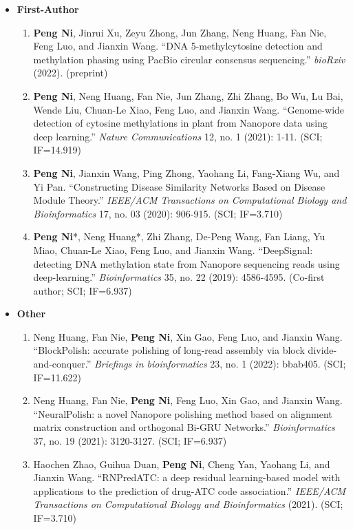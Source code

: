 \documentclass{resume}
\begin{document}
\begin{itemize}
  \item \textbf{First-Author}
  \begin{enumerate}
    \item \textbf{Peng Ni}, Jinrui Xu, Zeyu Zhong, Jun Zhang, Neng Huang, Fan Nie, Feng Luo, and Jianxin Wang. \enquote{DNA 5-methylcytosine detection and methylation phasing using PacBio circular consensus sequencing.} {\it bioRxiv} (2022). (preprint)
    \item \textbf{Peng Ni}, Neng Huang, Fan Nie, Jun Zhang, Zhi Zhang, Bo Wu, Lu Bai, Wende Liu, Chuan-Le Xiao, Feng Luo, and Jianxin Wang. \enquote{Genome-wide detection of cytosine methylations in plant from Nanopore data using deep learning.} {\it Nature Communications} 12, no. 1 (2021): 1-11. (SCI; IF=14.919)
    \item \textbf{Peng Ni}, Jianxin Wang, Ping Zhong, Yaohang Li, Fang-Xiang Wu, and Yi Pan. \enquote{Constructing Disease Similarity Networks Based on Disease Module Theory.} {\it IEEE/ACM Transactions on Computational Biology and Bioinformatics} 17, no. 03 (2020): 906-915. (SCI; IF=3.710)
    \item \textbf{Peng Ni}*, Neng Huang*, Zhi Zhang, De-Peng Wang, Fan Liang, Yu Miao, Chuan-Le Xiao, Feng Luo, and Jianxin Wang. \enquote{DeepSignal: detecting DNA methylation state from Nanopore sequencing reads using deep-learning.} {\it Bioinformatics} 35, no. 22 (2019): 4586-4595. (Co-first author; SCI; IF=6.937)
  \end{enumerate}
  \item \textbf{Other}
  \begin{enumerate}
    \item Neng Huang, Fan Nie, \textbf{Peng Ni}, Xin Gao, Feng Luo, and Jianxin Wang. \enquote{BlockPolish: accurate polishing of long-read assembly via block divide-and-conquer.} {\it Briefings in bioinformatics} 23, no. 1 (2022): bbab405. (SCI; IF=11.622)
    \item Neng Huang, Fan Nie, \textbf{Peng Ni}, Feng Luo, Xin Gao, and Jianxin Wang. \enquote{NeuralPolish: a novel Nanopore polishing method based on alignment matrix construction and orthogonal Bi-GRU Networks.} {\it Bioinformatics} 37, no. 19 (2021): 3120-3127. (SCI; IF=6.937)
    \item Haochen Zhao, Guihua Duan, \textbf{Peng Ni}, Cheng Yan, Yaohang Li, and Jianxin Wang. \enquote{RNPredATC: a deep residual learning-based model with applications to the prediction of drug-ATC code association.} {\it IEEE/ACM Transactions on Computational Biology and Bioinformatics} (2021). (SCI; IF=3.710)

\end{enumerate}
\end{itemize}
\end{document}
